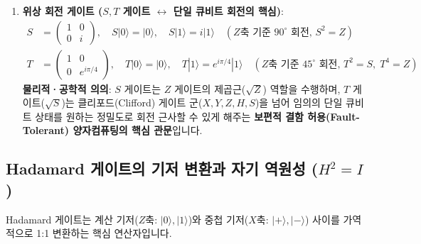 \documentclass[11pt, a4paper]{article}
\newcommand{\ket}[1]{|#1\rangle}
\theoremstyle{definition}
\begin{document}
\begin{enumerate}
    \textbf{기하학적 직관}: 블로흐 구의 \textbf{$(X+Z)/\sqrt{2}$ 대각선 축을 중심으로 $180^\circ$ 회전}하여 $Z$축 기저($\ket{0}, \ket{1}$)를 $X$축 기저($\ket{+}, \ket{-}$)로 1:1 변환합니다. 고전의 무작위 동전 던지기와 달리, $H^2 = I$의 완벽한 유니터리 가역성을 갖습니다.
    \item \textbf{위상 회전 게이트 ($S, T$ 게이트 $\leftrightarrow$ 단일 큐비트 회전의 핵심)}:
    \begin{align*}
    S &= \begin{pmatrix} 1 & 0 \\ 0 & i \end{pmatrix}, \quad S\ket{0} = \ket{0}, \quad S\ket{1} = i\ket{1} \quad (\text{$Z$축 기준 } 90^\circ \text{ 회전, } S^2=Z) \\[0.4em]
    T &= \begin{pmatrix} 1 & 0 \\ 0 & e^{i\pi/4} \end{pmatrix}, \quad T\ket{0} = \ket{0}, \quad T\ket{1} = e^{i\pi/4}\ket{1} \quad (\text{$Z$축 기준 } 45^\circ \text{ 회전, } T^2=S, \; T^4=Z)
    \end{align*}
    \textbf{물리적·공학적 의의}: $S$ 게이트는 $Z$ 게이트의 제곱근($\sqrt{Z}$) 역할을 수행하며, $T$ 게이트($\sqrt{S}$)는 클리포드(Clifford) 게이트 군($X, Y, Z, H, S$)을 넘어 임의의 단일 큐비트 상태를 원하는 정밀도로 회전 근사할 수 있게 해주는 \textbf{보편적 결함 허용(Fault-Tolerant) 양자컴퓨팅의 핵심 관문}입니다.
\end{enumerate}

\subsection{Hadamard 게이트의 기저 변환과 자기 역원성 (\texorpdfstring{$H^2 = I$}{H² = I})}
Hadamard 게이트는 계산 기저($Z$축: $\ket{0}, \ket{1}$)와 중첩 기저($X$축: $\ket{+}, \ket{-}$) 사이를 가역적으로 1:1 변환하는 핵심 연산자입니다.
\end{document}
